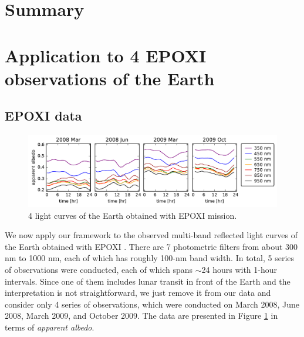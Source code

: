 \documentclass[iop,numberedappendix,apj,]{emulateapj}
\begin{document}
\section{Summary}
\label{s:summary}



\clearpage

\acknowledgments



\newpage

\appendix

\section{Application to 4 EPOXI observations of the Earth}
\label{s:epoxi}

\subsection{EPOXI data}
\label{ss:epoxidata}

\begin{figure}[b!]
    \begin{center}
\includegraphics[width=\hsize]{EPOXI_vislightcurve_4obs.pdf}
    \end{center}
    \caption{4 light curves of the Earth obtained with EPOXI mission.}
\label{fig:EPOXIlc}
\end{figure}

We now apply our framework to the observed multi-band reflected light curves of the Earth obtained with EPOXI \citep{Livengood2011, Cowan2011}. 
There are 7 photometric filters from about 300 nm to 1000 nm, each of which has roughly 100-nm band width. 
In total, 5 series of observations were conducted, each of which spans $\sim $24 hours with 1-hour intervals. 
Since one of them includes lunar transit in front of the Earth and the interpretation is not straightforward, we just remove it from our data and consider only 4 series of observations, which were conducted on March 2008, June 2008, March 2009, and October 2009. 
The data are presented in Figure \ref{fig:EPOXIlc} in terms of {\it apparent albedo}. 
\end{document}
